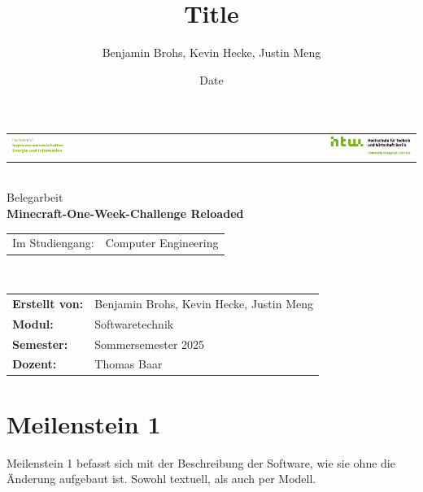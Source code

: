 \documentclass{article}
\title{Title}
\author{Benjamin Brohs, Kevin Hecke, Justin Meng}
\date{Date}
\begin{document}

\begin{titlepage}
  \centering
	\begin{tabular}{lcr}
		\includegraphics[width=0.35\textwidth]{fachbereich.png} & \hspace{0.195\textwidth} & \includegraphics[width=0.35\textwidth]{Q04_HTW_Berlin_Logo_quer_pos_FARBIG_RGB.jpg}\\
	\end{tabular}	
	\\[3cm]
	\Large
	Belegarbeit\\
	\vspace{2cm}
	\textbf{Minecraft-One-Week-Challenge Reloaded}\\
	\vspace{2cm}
	\begin{tabular}{ll} 
		Im Studiengang: & Computer Engineering \\		
	\end{tabular}	
	\\[3cm]
	\normalsize
	\begin{tabular}{ll}
	      \textbf{Erstellt von:} & Benjamin Brohs, Kevin Hecke, Justin Meng \\
        \textbf{Modul:} & Softwaretechnik \\
        \textbf{Semester:} & Sommersemester 2025 \\
	\textbf{Dozent:} & Thomas Baar
	\end{tabular}	
\end{titlepage}

\tableofcontents

\newpage


\section{Meilenstein 1} \label{sec:ms1}

Meilenstein 1 befasst sich mit der Beschreibung der Software, wie sie ohne die Änderung aufgebaut ist. Sowohl textuell, als auch per Modell.
\end{document}
